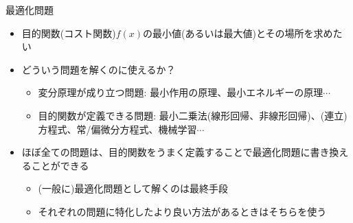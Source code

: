 \begin{frame}[t,fragile]{最適化問題}
  \begin{itemize}
  \item 目的関数(コスト関数)$f(x)$の最小値(あるいは最大値)とその場所を求めたい
  \item どういう問題を解くのに使えるか？
    \begin{itemize}
    \item 変分原理が成り立つ問題: 最小作用の原理、最小エネルギーの原理$\cdots$
    \item 目的関数が定義できる問題: 最小二乗法(線形回帰、非線形回帰)、(連立)方程式、常/偏微分方程式、機械学習$\cdots$
    \end{itemize}
  \item ほぼ全ての問題は、目的関数をうまく定義することで最適化問題に書き換えることができる
    \begin{itemize}
    \item (一般に)最適化問題として解くのは最終手段
    \item それぞれの問題に特化したより良い方法があるときはそちらを使う
    \end{itemize}
  \end{itemize}
\end{frame}
